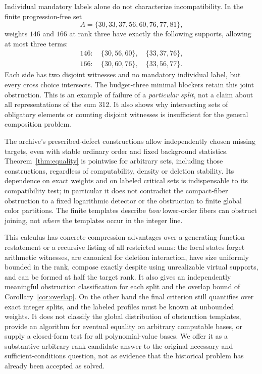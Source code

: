 \documentclass[11pt]{article}
\theoremstyle{remark}\newtheorem{remark}[theorem]{Remark}
\begin{document}
Individual mandatory labels alone do not characterize incompatibility. In the finite progression-free set
\[A=\{30,33,37,56,60,76,77,81\},\]
weights $146$ and $166$ at rank three have exactly the following supports, allowing at most three terms:
\begin{align*}
 146:&\ \{30,56,60\},\quad\{33,37,76\},\\
 166:&\ \{30,60,76\},\quad\{33,56,77\}.
\end{align*}
Each side has two disjoint witnesses and no mandatory individual label, but every cross choice intersects. The budget-three minimal blockers retain this joint obstruction. This is an example of failure of a \emph{particular split}, not a claim about all representations of the sum 312. It also shows why intersecting sets of obligatory elements or counting disjoint witnesses is insufficient for the general composition problem.

The archive's prescribed-defect constructions allow independently chosen missing targets, even with stable ordinary order and fixed background statistics. Theorem~\ref{thm:equality} is pointwise for arbitrary sets, including those constructions, regardless of computability, density or deletion stability. Its dependence on exact weights and on labeled critical sets is indispensable to its compatibility test; in particular it does not contradict the compact-fiber obstruction to a fixed logarithmic detector or the obstruction to finite global color partitions. The finite templates describe \emph{how} lower-order fibers can obstruct joining, not \emph{where} the templates occur in the integer line.

This calculus has concrete compression advantages over a generating-function restatement or a recursive listing of all restricted sums: the local states forget arithmetic witnesses, are canonical for deletion interaction, have size uniformly bounded in the rank, compose exactly despite using unrealizable virtual supports, and can be formed at half the target rank. It also gives an independently meaningful obstruction classification for each split and the overlap bound of Corollary~\ref{cor:overlap}. On the other hand the final criterion still quantifies over exact integer splits, and the labeled profiles must be known at unbounded weights. It does not classify the global distribution of obstruction templates, provide an algorithm for eventual equality on arbitrary computable bases, or supply a closed-form test for all polynomial-value bases. We offer it as a substantive arbitrary-rank candidate answer to the original necessary-and-sufficient-conditions question, not as evidence that the historical problem has already been accepted as solved.
\end{document}
